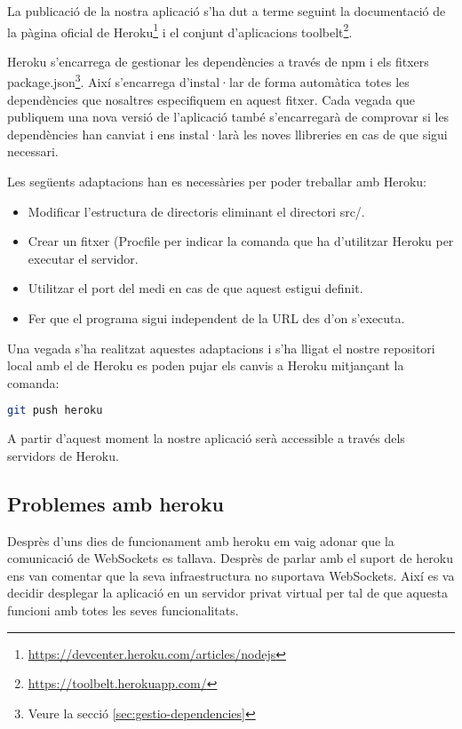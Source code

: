 La publicació de la nostra aplicació s'ha dut a terme seguint la documentació de la pàgina oficial de Heroku\footnote{\url{https://devcenter.heroku.com/articles/nodejs}} i el conjunt d'aplicacions toolbelt\footnote{\url{https://toolbelt.herokuapp.com/}}. 

Heroku s'encarrega de gestionar les dependències a través de npm i els fitxers package.json\footnote{Veure la secció \ref{sec:gestio-dependencies}}. Així s'encarrega d'instal·lar de forma automàtica totes les dependències que nosaltres especifiquem en aquest fitxer. Cada vegada que publiquem una nova versió de l'aplicació també s'encarregarà de comprovar si les dependències han canviat i ens instal·larà les noves llibreries en cas de que sigui necessari. 

Les següents adaptacions han es necessàries per poder treballar amb Heroku: 

\begin{itemize}
\item{Modificar l'estructura de directoris eliminant el directori src/.}
\item{Crear un fitxer (Procfile per indicar la comanda que ha d'utilitzar Heroku per executar el servidor.}
\item{Utilitzar el port del medi en cas de que aquest estigui definit. }
\item{Fer que el programa sigui independent de la URL des d'on s'executa.}
\end{itemize}

Una vegada s'ha realitzat aquestes adaptacions i s'ha lligat el nostre repositori local amb el de Heroku es poden pujar els canvis a Heroku mitjançant la comanda: 

\begin{lstlisting}[language=bash]
git push heroku
\end{lstlisting}

A partir d'aquest moment la nostre aplicació serà accessible a través dels servidors de Heroku.

\subsection{Problemes amb heroku}

Desprès d'uns dies de funcionament amb heroku em vaig adonar que la comunicació de WebSockets es tallava. Desprès de parlar amb el suport de heroku ens van comentar que la seva infraestructura no suportava WebSockets. Així es va decidir desplegar la aplicació en un servidor privat virtual per tal de que aquesta funcioni amb totes les seves funcionalitats. 

